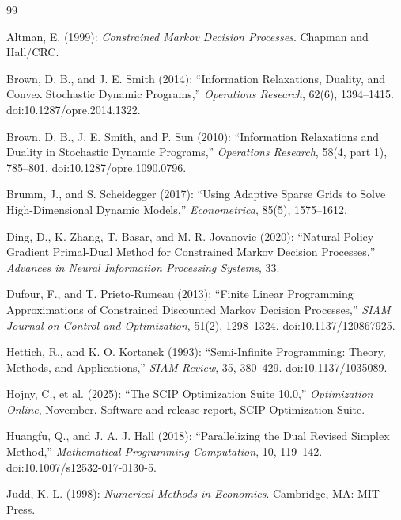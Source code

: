 \begin{thebibliography}{99}

Altman, E. (1999): \emph{Constrained Markov Decision Processes}. Chapman and Hall/CRC.

Brown, D. B., and J. E. Smith (2014): ``Information Relaxations, Duality, and Convex Stochastic Dynamic Programs,'' \emph{Operations Research}, 62(6), 1394--1415. doi:10.1287/opre.2014.1322.

Brown, D. B., J. E. Smith, and P. Sun (2010): ``Information Relaxations and Duality in Stochastic Dynamic Programs,'' \emph{Operations Research}, 58(4, part 1), 785--801. doi:10.1287/opre.1090.0796.

Brumm, J., and S. Scheidegger (2017): ``Using Adaptive Sparse Grids to Solve High-Dimensional Dynamic Models,'' \emph{Econometrica}, 85(5), 1575--1612.

Ding, D., K. Zhang, T. Basar, and M. R. Jovanovic (2020): ``Natural Policy Gradient Primal-Dual Method for Constrained Markov Decision Processes,'' \emph{Advances in Neural Information Processing Systems}, 33.

Dufour, F., and T. Prieto-Rumeau (2013): ``Finite Linear Programming Approximations of Constrained Discounted Markov Decision Processes,'' \emph{SIAM Journal on Control and Optimization}, 51(2), 1298--1324. doi:10.1137/120867925.

Hettich, R., and K. O. Kortanek (1993): ``Semi-Infinite Programming: Theory, Methods, and Applications,'' \emph{SIAM Review}, 35, 380--429. doi:10.1137/1035089.


Hojny, C., et al. (2025): ``The SCIP Optimization Suite 10.0,'' \emph{Optimization Online}, November. Software and release report, SCIP Optimization Suite.

Huangfu, Q., and J. A. J. Hall (2018): ``Parallelizing the Dual Revised Simplex Method,'' \emph{Mathematical Programming Computation}, 10, 119--142. doi:10.1007/s12532-017-0130-5.

Judd, K. L. (1998): \emph{Numerical Methods in Economics}. Cambridge, MA: MIT Press.


\end{thebibliography}
